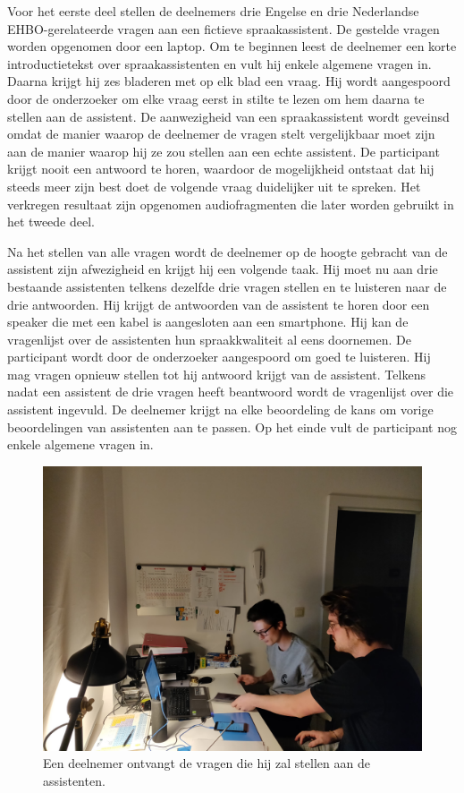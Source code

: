 Voor het eerste deel stellen de deelnemers drie Engelse en drie Nederlandse EHBO-gerelateerde vragen aan een fictieve spraakassistent. De gestelde vragen worden opgenomen door een laptop.
Om te beginnen leest de deelnemer een korte introductietekst over spraakassistenten en vult hij enkele algemene vragen in. Daarna krijgt hij zes bladeren met op elk blad een vraag. Hij wordt aangespoord door de onderzoeker om elke vraag eerst in stilte te lezen om hem daarna te stellen aan de assistent. De aanwezigheid van een spraakassistent wordt geveinsd omdat de manier waarop de deelnemer de vragen stelt vergelijkbaar moet zijn aan de manier waarop hij ze zou stellen aan een echte assistent. De participant krijgt nooit een antwoord te horen, waardoor de mogelijkheid ontstaat dat hij steeds meer zijn best doet de volgende vraag duidelijker uit te spreken. Het verkregen resultaat zijn opgenomen audiofragmenten die later worden gebruikt in het tweede deel.

Na het stellen van alle vragen wordt de deelnemer op de hoogte gebracht van de assistent zijn afwezigheid en krijgt hij een volgende taak. Hij moet nu aan drie bestaande assistenten telkens dezelfde drie vragen stellen en te luisteren naar de drie antwoorden. Hij krijgt de antwoorden van de assistent te horen door een speaker die met een kabel is aangesloten aan een smartphone. Hij kan de vragenlijst over de assistenten hun spraakkwaliteit al eens doornemen. De participant wordt door de onderzoeker aangespoord om goed te luisteren. Hij mag vragen opnieuw stellen tot hij antwoord krijgt van de assistent. Telkens nadat een assistent de drie vragen heeft beantwoord wordt de vragenlijst over die assistent ingevuld. De deelnemer krijgt na elke beoordeling de kans om vorige beoordelingen van assistenten aan te passen. Op het einde vult de participant nog enkele algemene vragen in.

\begin{figure}[h]
    \includegraphics[width=0.7\linewidth]{img/proefafname2}
    \caption{Een deelnemer ontvangt de vragen die hij zal stellen aan de assistenten.}
    \label{fig:proefafname1}
\end{figure}

